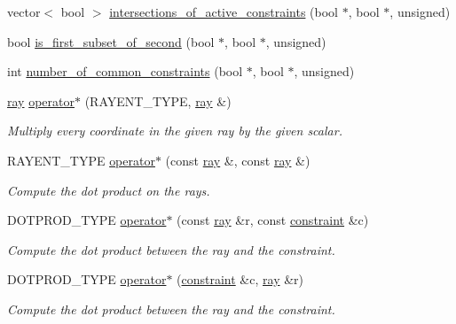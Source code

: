 \begin{DoxyCompactItemize}
\item 
vector$<$ bool $>$ \hyperlink{group___c_l_s_solvers_gacb5ce7e22db91b33c26ea0be6a6026de}{intersections\+\_\+of\+\_\+active\+\_\+constraints} (bool $\ast$, bool $\ast$, unsigned)
\item 
bool \hyperlink{group___c_l_s_solvers_ga06bebd50facdc36f850371e545f82174}{is\+\_\+first\+\_\+subset\+\_\+of\+\_\+second} (bool $\ast$, bool $\ast$, unsigned)
\item 
int \hyperlink{group___c_l_s_solvers_ga33829eddeaa7be000404e4d281d90973}{number\+\_\+of\+\_\+common\+\_\+constraints} (bool $\ast$, bool $\ast$, unsigned)
\item 
\hyperlink{group___c_l_s_solvers_classray}{ray} \hyperlink{group___c_l_s_solvers_gae039f9fb46b8c57063342f6203add523}{operator$\ast$} (R\+A\+Y\+E\+N\+T\+\_\+\+T\+Y\+PE, \hyperlink{group___c_l_s_solvers_classray}{ray} \&)
\begin{DoxyCompactList}\small\item\em Multiply every coordinate in the given ray by the given scalar. \end{DoxyCompactList}\item 
R\+A\+Y\+E\+N\+T\+\_\+\+T\+Y\+PE \hyperlink{group___c_l_s_solvers_ga30af4b27086e461f862e7d16e9d209df}{operator$\ast$} (const \hyperlink{group___c_l_s_solvers_classray}{ray} \&, const \hyperlink{group___c_l_s_solvers_classray}{ray} \&)
\begin{DoxyCompactList}\small\item\em Compute the dot product on the rays. \end{DoxyCompactList}\item 
D\+O\+T\+P\+R\+O\+D\+\_\+\+T\+Y\+PE \hyperlink{group___c_l_s_solvers_gac22c25c0110c6684317aaf0e50c2e9a0}{operator$\ast$} (const \hyperlink{group___c_l_s_solvers_classray}{ray} \&r, const \hyperlink{group___c_l_s_solvers_classconstraint}{constraint} \&c)
\begin{DoxyCompactList}\small\item\em Compute the dot product between the ray and the constraint. \end{DoxyCompactList}\item 
D\+O\+T\+P\+R\+O\+D\+\_\+\+T\+Y\+PE \hyperlink{group___c_l_s_solvers_ga240d91c518c3bfe3817504de43039022}{operator$\ast$} (\hyperlink{group___c_l_s_solvers_classconstraint}{constraint} \&c, \hyperlink{group___c_l_s_solvers_classray}{ray} \&r)
\begin{DoxyCompactList}\small\item\em Compute the dot product between the ray and the constraint. \end{DoxyCompactList}\item 

\end{DoxyCompactItemize}
